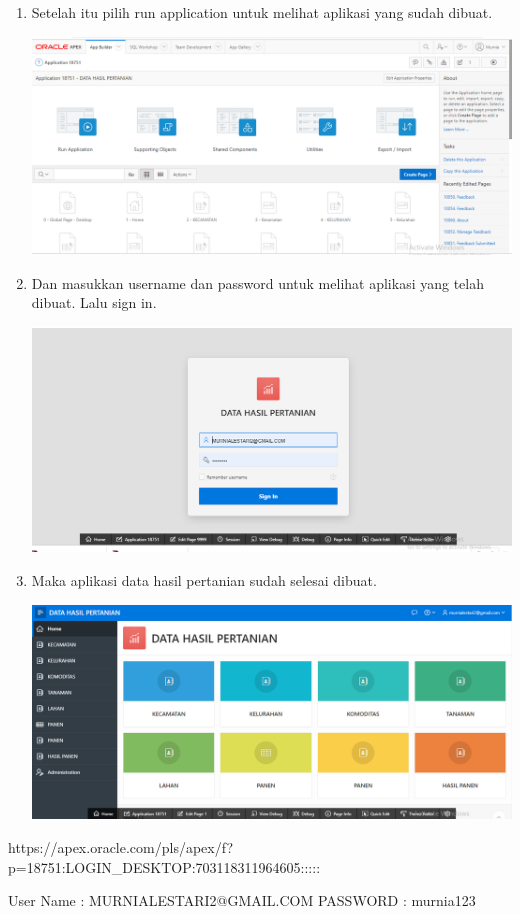 \documentclass{article}
\begin{document}
\begin{enumerate}
\begin{center}
        \end{center}
         \item Setelah itu pilih run application untuk melihat aplikasi yang sudah dibuat.
         \begin{center}
              \includegraphics[width=.8\textwidth]{figure/31.PNG}
        \end{center}
        \item Dan masukkan username dan password untuk melihat aplikasi yang telah dibuat. Lalu sign in.
        \begin{center}
              \includegraphics[width=.8\textwidth]{figure/32.PNG}
        \end{center}
        \newpage\item Maka aplikasi data hasil pertanian sudah selesai dibuat. 
        \begin{center}
              \includegraphics[width=.8\textwidth]{figure/33.PNG}
        \end{center}
\end{enumerate}
\usepackage{listings} https://apex.oracle.com/pls/apex/f?p=18751:LOGIN_DESKTOP:703118311964605:::::
\par User Name : MURNIALESTARI2@GMAIL.COM
PASSWORD : murnia123
\end{document}
